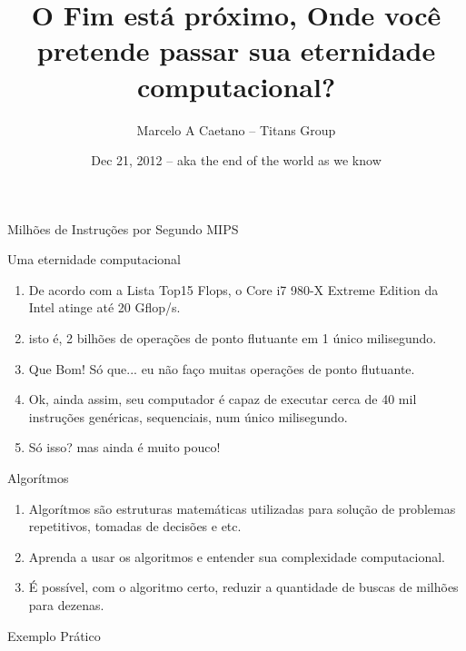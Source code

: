 \documentclass{beamer}
\title[Performance em Python]{O Fim está próximo, Onde você pretende passar sua eternidade computacional?}
\author{Marcelo A Caetano -- Titans Group}
\date{Dec 21, 2012 -- aka the end of the world as we know}
\begin{document}
  \begin{frame}
    \titlepage
  \end{frame}
  \begin{frame}{Milhões de Instruções por Segundo MIPS}
    \begin{block}{Uma eternidade computacional}
      \begin{enumerate}
        \item<1-| alert@1> De acordo com a Lista Top15 Flops, o Core i7 980-X Extreme Edition da Intel atinge até 20 Gflop/s.
        \item<2 -> isto é, 2 bilhões de operações de ponto flutuante em 1 único milisegundo.
        \item<3 -> Que Bom! Só que... eu não faço muitas operações de ponto flutuante.
        \item<4 -> Ok, ainda assim, seu computador é capaz de executar cerca de 40 mil instruções genéricas, sequenciais, num único milisegundo.
        \item<5 -> Só isso? mas ainda é muito pouco!
      \end{enumerate}
    \end{block}
  \end{frame} 
  \begin{frame}{Algorítmos}
    \begin{enumerate}
     \item<1 -> Algorítmos são estruturas matemáticas utilizadas para solução de problemas repetitivos, tomadas de decisões e etc.
     \item<2 -> Aprenda a usar os algoritmos e entender sua complexidade computacional.
     \item<3 -> É possível, com o algoritmo certo, reduzir a quantidade de buscas de milhões para dezenas.
    \end{enumerate}
  \end{frame}
  \begin{frame}{Exemplo Prático}
   
  \end{frame}
\end{document}
